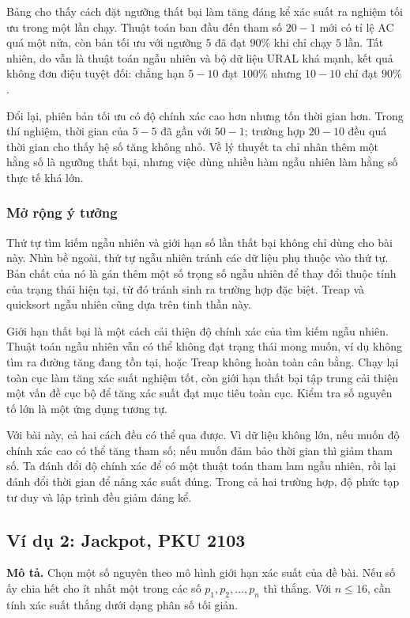 \documentclass[11pt]{article}
\begin{document}
Bảng cho thấy cách đặt ngưỡng thất bại làm tăng đáng kể xác suất ra nghiệm
tối ưu trong một lần chạy. Thuật toán ban đầu đến tham số \(20-1\) mới có tỉ
lệ AC quá một nửa, còn bản tối ưu với ngưỡng \(5\) đã đạt \(90\%\) khi chỉ
chạy \(5\) lần. Tất nhiên, do vẫn là thuật toán ngẫu nhiên và bộ dữ liệu
URAL khá mạnh, kết quả không đơn điệu tuyệt đối: chẳng hạn \(5-10\) đạt
\(100\%\) nhưng \(10-10\) chỉ đạt \(90\%\).

Đổi lại, phiên bản tối ưu có độ chính xác cao hơn nhưng tốn thời gian hơn.
Trong thí nghiệm, thời gian của \(5-5\) đã gần với \(50-1\); trường hợp
\(20-10\) đều quá thời gian cho thấy hệ số tăng không nhỏ. Về lý thuyết ta
chỉ nhân thêm một hằng số là ngưỡng thất bại, nhưng việc dùng nhiều hàm ngẫu
nhiên làm hằng số thực tế khá lớn.

\subsubsection{Mở rộng ý tưởng}

Thứ tự tìm kiếm ngẫu nhiên và giới hạn số lần thất bại không chỉ dùng cho
bài này. Nhìn bề ngoài, thứ tự ngẫu nhiên tránh các dữ liệu phụ thuộc vào
thứ tự. Bản chất của nó là gán thêm một số trọng số ngẫu nhiên để thay đổi
thuộc tính của trạng thái hiện tại, từ đó tránh sinh ra trường hợp đặc biệt.
Treap và quicksort ngẫu nhiên cũng dựa trên tinh thần này.

Giới hạn thất bại là một cách cải thiện độ chính xác của tìm kiếm ngẫu nhiên.
Thuật toán ngẫu nhiên vẫn có thể không đạt trạng thái mong muốn, ví dụ không
tìm ra đường tăng đang tồn tại, hoặc Treap không hoàn toàn cân bằng. Chạy lại
toàn cục làm tăng xác suất nghiệm tốt, còn giới hạn thất bại tập trung cải
thiện một vấn đề cục bộ để tăng xác suất đạt mục tiêu toàn cục. Kiểm tra số
nguyên tố lớn là một ứng dụng tương tự.

Với bài này, cả hai cách đều có thể qua được. Vì dữ liệu không lớn, nếu muốn
độ chính xác cao có thể tăng tham số; nếu muốn đảm bảo thời gian thì giảm
tham số. Ta đánh đổi độ chính xác để có một thuật toán tham lam ngẫu nhiên,
rồi lại đánh đổi thời gian để nâng xác suất đúng. Trong cả hai trường hợp,
độ phức tạp tư duy và lập trình đều giảm đáng kể.

\subsection{Ví dụ 2: Jackpot, PKU 2103}

\textbf{Mô tả.} Chọn một số nguyên theo mô hình giới hạn xác suất của đề bài.
Nếu số ấy chia hết cho ít nhất một trong các số \(p_1,p_2,\ldots,p_n\) thì
thắng. Với \(n\le 16\), cần tính xác suất thắng dưới dạng phân số tối giản.
\end{document}

